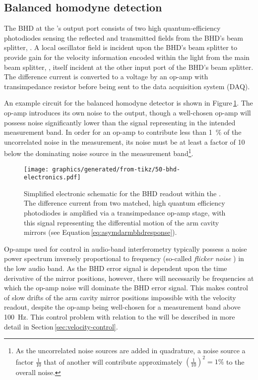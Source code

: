 \subsection{\label{sec:bhd}Balanced homodyne detection}
     
The \gls{BHD} at the \SSMEXPT{}'s output port consists of two high quantum-efficiency photodiodes sensing the reflected and transmitted fields from the \gls{BHD}'s beam splitter, \MSIXTEEN{}. A local oscillator field is incident upon the \gls{BHD}'s beam splitter to provide gain for the velocity information encoded within the light from the main beam splitter, \MSIX{}, itself incident at the other input port of the \gls{BHD}'s beam splitter. The difference current is converted to a voltage by an op-amp with transimpedance resistor \RT{} before being sent to the data acquisition system (\gls{DAQ}).

An example circuit for the balanced homodyne detector is shown in Figure\,\ref{fig:bhd-electronics}. The op-amp introduces its own noise to the output, though a well-chosen op-amp will possess noise significantly lower than the signal representing \LMINUS{} in the intended measurement band. In order for an op-amp to contribute less than \SI{1}{\percent} of the uncorrelated noise in the measurement, its noise must be at least a factor of \SI{10}{} below the dominating noise source in the measurement band\footnote{As the uncorrelated noise sources are added in quadrature, a noise source a factor $\frac{1}{10}$ that of another will contribute approximately $\left(\frac{1}{10}\right)^2 = 1\%$ to the overall noise.}.

\begin{figure}
  \centering
  \texttt{[image: graphics/generated/from-tikz/50-bhd-electronics.pdf]}
  \caption[Electronic schematic for the balanced homodyne readout]{\label{fig:bhd-electronics}Simplified electronic schematic for the BHD readout within the \SSMEXPT{}. The difference current from two matched, high quantum efficiency photodiodes is amplified via a transimpedance op-amp stage, with this signal representing the differential motion of the arm cavity mirrors (see Equation\,\ref{eq:asymdarmbhdresponse}).}
\end{figure}

Op-amps used for control in audio-band interferometry typically possess a noise power spectrum inversely proportional to frequency (so-called \emph{flicker noise} \cite[Section\,11.2.3]{Gray2009}) in the low audio band. As the \gls{BHD} error signal is dependent upon the time derivative of the mirror positions, however, there will necessarily be frequencies at which the op-amp noise will dominate the \gls{BHD} error signal. This makes control of slow drifts of the arm cavity mirror positions impossible with the velocity readout, despite the op-amp being well-chosen for a measurement band above \SI{100}{\hertz}. This control problem with relation to the \SSMEXPT{} will be described in more detail in Section\,\ref{sec:velocity-control}.

